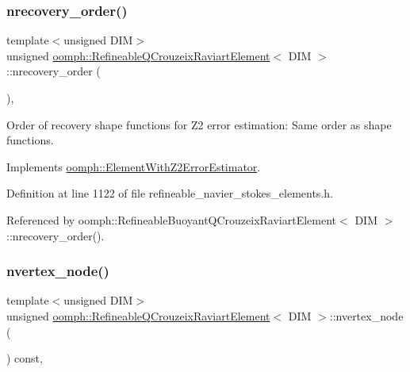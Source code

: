 \mbox{\label{classoomph_1_1RefineableQCrouzeixRaviartElement_a623aa5e918f7e6acfee3107de07f4afb}} 
\subsubsection{\texorpdfstring{nrecovery\+\_\+order()}{nrecovery\_order()}}
{\footnotesize\ttfamily template$<$unsigned D\+IM$>$ \\
unsigned \hyperlink{classoomph_1_1RefineableQCrouzeixRaviartElement}{oomph\+::\+Refineable\+Q\+Crouzeix\+Raviart\+Element}$<$ D\+IM $>$\+::nrecovery\+\_\+order (\begin{DoxyParamCaption}{ }\end{DoxyParamCaption})\hspace{0.3cm}{\ttfamily [inline]}, {\ttfamily [virtual]}}



Order of recovery shape functions for Z2 error estimation\+: Same order as shape functions. 



Implements \hyperlink{classoomph_1_1ElementWithZ2ErrorEstimator_af39480835bd3e0f6b2f4f7a9a4044798}{oomph\+::\+Element\+With\+Z2\+Error\+Estimator}.



Definition at line 1122 of file refineable\+\_\+navier\+\_\+stokes\+\_\+elements.\+h.



Referenced by oomph\+::\+Refineable\+Buoyant\+Q\+Crouzeix\+Raviart\+Element$<$ D\+I\+M $>$\+::nrecovery\+\_\+order().

\mbox{\label{classoomph_1_1RefineableQCrouzeixRaviartElement_aca4403f291e107cfcbf34009647c0527}} 
\subsubsection{\texorpdfstring{nvertex\+\_\+node()}{nvertex\_node()}}
{\footnotesize\ttfamily template$<$unsigned D\+IM$>$ \\
unsigned \hyperlink{classoomph_1_1RefineableQCrouzeixRaviartElement}{oomph\+::\+Refineable\+Q\+Crouzeix\+Raviart\+Element}$<$ D\+IM $>$\+::nvertex\+\_\+node (\begin{DoxyParamCaption}{ }\end{DoxyParamCaption}) const\hspace{0.3cm}{\ttfamily [inline]}, {\ttfamily [virtual]}}



